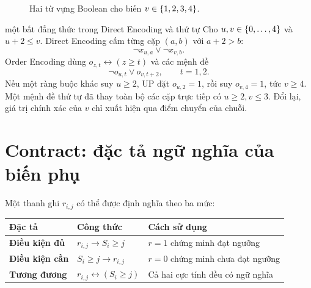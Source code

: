 \begin{figure}[tb]
\centering
{}
\caption{Hai từ vựng Boolean cho biến \(v\in\left\{1,2,3,4\right\}\).}
\label{fig:direct-order-domain}
\end{figure}

\begin{workedexample}{một bất đẳng thức trong Direct Encoding và thứ tự}
Cho \(u,v\in\left\{0,\ldots,4\right\}\) và \(u+2\le v\). Direct Encoding cấm từng cặp
\((a,b)\) với \(a+2>b\):
\[
  \neg x_{u,a}\lor\neg x_{v,b}.
\]
Order Encoding dùng \(o_{z,t}\leftrightarrow(z\ge t)\) và các mệnh đề
\[
  \neg o_{u,t}\lor o_{v,t+2},
  \qquad t=1,2.
\]
Nếu một ràng buộc khác suy \(u\ge2\), UP đặt \(o_{u,2}=1\), rồi suy
\(o_{v,4}=1\), tức \(v\ge4\). Một mệnh đề thứ tự đã thay toàn bộ các cặp trực tiếp
có \(u\ge2,v\le3\). Đổi lại, giá trị chính xác của \(v\) chỉ xuất hiện qua điểm chuyển
của chuỗi.
\end{workedexample}

\section{Contract: đặc tả ngữ nghĩa của biến phụ}

Một thanh ghi \(r_{i,j}\) có thể được định nghĩa theo ba mức:
\begin{center}
\label{tab:threshold-contracts}
\begin{tabularx}{\textwidth}{@{}>{\bfseries\sffamily}p{}YY@{}}
\toprule
Đặc tả & Công thức & Cách sử dụng\\
\midrule
Điều kiện đủ & \(r_{i,j}\rightarrow S_i\ge j\) &
\(r=1\) chứng minh đạt ngưỡng\\
Điều kiện cần & \(S_i\ge j\rightarrow r_{i,j}\) &
\(r=0\) chứng minh chưa đạt ngưỡng\\
Tương đương & \(r_{i,j}\leftrightarrow(S_i\ge j)\) &
Cả hai cực tính đều có ngữ nghĩa\\
\bottomrule
\end{tabularx}
\end{center}

